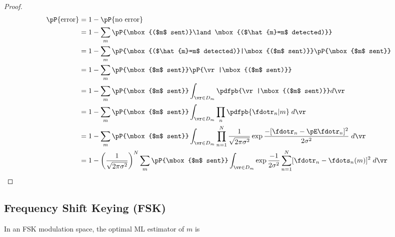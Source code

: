 \begin{proof}
\begin{align*}
   \pP{\mbox{error}}
     &= 1 - \pP{\mbox{no error}}
   \\&= 1 - \sum_m \pP{\mbox{($m$ sent)}\land\mbox{($\hat{m}=m$ detected)}}
   \\&= 1 - \sum_m \pP{\mbox{($\hat{m}=m$ detected)}|\mbox{($m$ sent)}}
                    \pP{\mbox{$m$ sent}}
   \\&= 1 - \sum_m \pP{\mbox{$m$ sent}}
                    \pP{\vr |\mbox{($m$ sent)}}
   \\&= 1 - \sum_m \pP{\mbox{$m$ sent}}
                    \int_{\vr \in D_m}\pdfpb{\vr |\mbox{($m$ sent)}} d\vr 
   \\&= 1 - \sum_m \pP{\mbox{$m$ sent}}
                    \int_{\vr \in D_m} \prod_n \pdfpb{\fdotr_n|m} \;d\vr 
   \\&= 1 - \sum_m \pP{\mbox{$m$ sent}}
                    \int_{\vr \in D_m} \prod_{n=1}^N
                    \frac{1}{\sqrt{2\pi\sigma^2}}
                    \exp{\frac{-[\fdotr_n-\pE\fdotr_n]^2}{2\sigma^2}}
                    \;d\vr 
   \\&= 1 - \left( \frac{1}{\sqrt{2\pi\sigma^2}} \right)^N
         \sum_m \pP{\mbox{$m$ sent}}
         \int_{\vr \in D_m}
         \exp{\frac{-1}{2\sigma^2}
                   \sum_{n=1}^N [\fdotr_n-\fdots_n(m)]^2 }
         \;d\vr 
\end{align*}
\end{proof}



\subsection{Frequency Shift Keying (FSK)}
\begin{theorem}
In an FSK modulation space,
the optimal ML estimator of $m$ is
\end{theorem}

